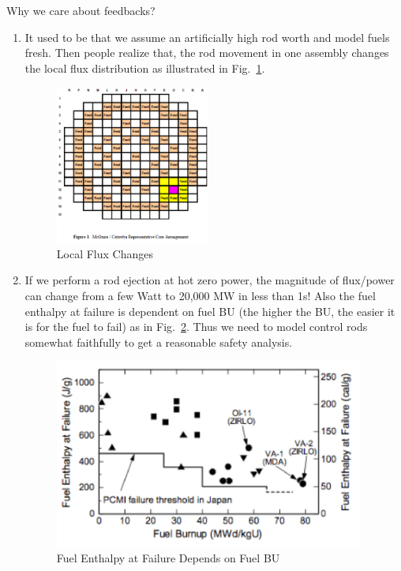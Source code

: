 \documentclass{school-22.211-notes}
\date{April 30, 2012}
\begin{document}
\maketitle

Why we care about feedbacks? 
\begin{enumerate}
\item It used to be that we assume an artificially high rod worth and model fuels fresh. Then people realize that, the rod movement in one assembly changes the local flux distribution as illustrated in Fig.~\ref{local-flux-changes}. 
  \begin{figure}[ht]
    \centering
    \includegraphics[width=2in]{images/pke/local-flux-changes.png}
    \caption{Local Flux Changes} \label{local-flux-changes}
  \end{figure}

\item If we perform a rod ejection at hot zero power, the magnitude of flux/power can change from a few Watt to 20,000 MW in less than 1s! Also the fuel enthalpy at failure is dependent on fuel BU (the higher the BU, the easier it is for the fuel to fail) as in Fig.~\ref{failure-depend-on-BU}. Thus we need to model control rods somewhat faithfully to get a reasonable safety analysis. 
  \begin{figure}[ht]
    \centering
    \includegraphics[width=4in]{images/pke/failure-depend-on-BU.png}
    \caption{Fuel Enthalpy at Failure Depends on Fuel BU} \label{failure-depend-on-BU}
  \end{figure}


\end{enumerate}
\end{document}

